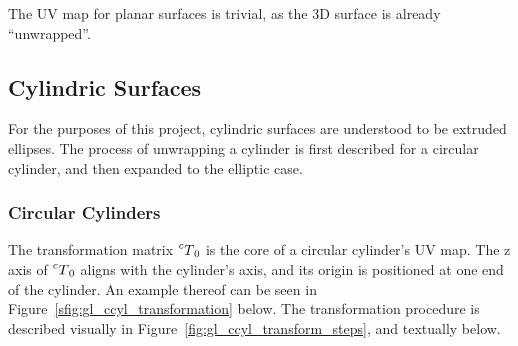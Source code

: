 The UV map for planar surfaces is trivial, as the 3D surface is already ``unwrapped''.

\subsection{Cylindric Surfaces}
For the purposes of this project, cylindric surfaces are understood to be extruded ellipses.
The process of unwrapping a cylinder is first described for a circular cylinder, and then expanded to the elliptic case.

\subsubsection{Circular Cylinders}
The transformation matrix $\prescript{c}{}T_0$ is the core of a circular cylinder's UV map.
The z axis of $\prescript{c}{}T_0$ aligns with the cylinder's axis, and its origin is positioned at one end of the cylinder.
An example thereof can be seen in Figure~\ref{sfig:gl_ccyl_transformation} below.
The transformation procedure is described visually in Figure~\ref{fig:gl_ccyl_transform_steps}, and textually below.
